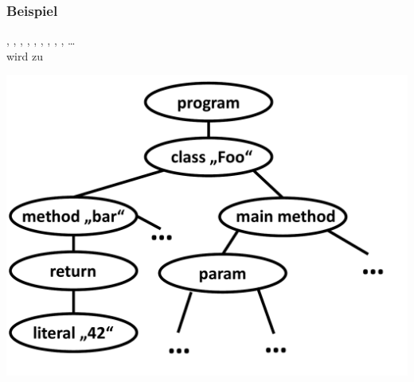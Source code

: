 \begin{frame}
	\frametitle{Beispiel}
	, , \token{\{}, , , , \token{(}, \token{)}, \token{\{}, \ldots \\
        wird zu \\
     \begin{center}
     \includegraphics[scale=0.3]{images/AST.pdf}
     \end{center}
\end{frame}
